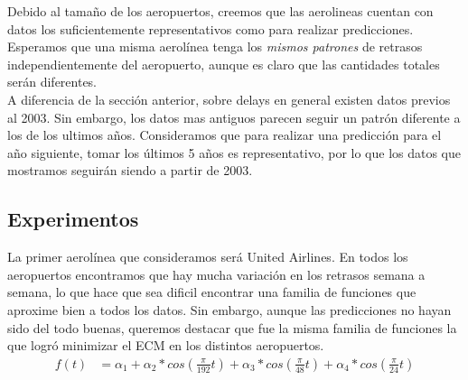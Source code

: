 Debido al tamaño de los aeropuertos, creemos que las aerolineas cuentan con datos los suficientemente representativos como para realizar predicciones. Esperamos que una misma aerolínea tenga los \textit{mismos patrones} de retrasos independientemente del aeropuerto, aunque es claro que las cantidades totales serán diferentes. \\

A diferencia de la sección anterior, sobre delays en general existen datos previos al 2003. Sin embargo, los datos mas antiguos parecen seguir un patrón diferente a los de los ultimos años. Consideramos que para realizar una predicción para el año siguiente, tomar los últimos 5 años es representativo, por lo que los datos que mostramos seguirán siendo a partir de 2003. \\


\subsection{Experimentos}

La primer aerolínea que consideramos será United Airlines. En todos los aeropuertos encontramos que hay mucha variación en los retrasos semana a semana, lo que hace que sea dificil encontrar una familia de funciones que aproxime bien a todos los datos. Sin embargo, aunque las predicciones no hayan sido del todo buenas, queremos destacar que fue la misma familia de funciones la que logró minimizar el ECM en los distintos aeropuertos. \\

\begin{align}
f(t) &= \alpha_1 + \alpha_2 * cos(\frac{\pi}{192} t) + \alpha_3 * cos(\frac{\pi}{48} t) + \alpha_4 * cos(\frac{\pi}{24} t)
\end{align}



